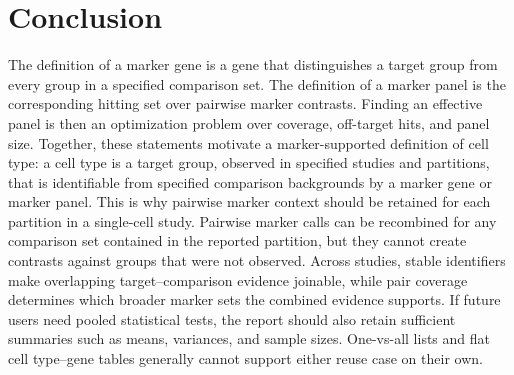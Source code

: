 \documentclass{article}
\begin{document}
\section{Conclusion}

The definition of a marker gene is a gene that distinguishes a target group from every group in a specified comparison set. The definition of a marker panel is the corresponding hitting set over pairwise marker contrasts. Finding an effective panel is then an optimization problem over coverage, off-target hits, and panel size. Together, these statements motivate a marker-supported definition of cell type: a cell type is a target group, observed in specified studies and partitions, that is identifiable from specified comparison backgrounds by a marker gene or marker panel. This is why pairwise marker context should be retained for each partition in a single-cell study. Pairwise marker calls can be recombined for any comparison set contained in the reported partition, but they cannot create contrasts against groups that were not observed. Across studies, stable identifiers make overlapping target--comparison evidence joinable, while pair coverage determines which broader marker sets the combined evidence supports. If future users need pooled statistical tests, the report should also retain sufficient summaries such as means, variances, and sample sizes. One-vs-all lists and flat cell type--gene tables generally cannot support either reuse case on their own.

\newpage


\end{document}
